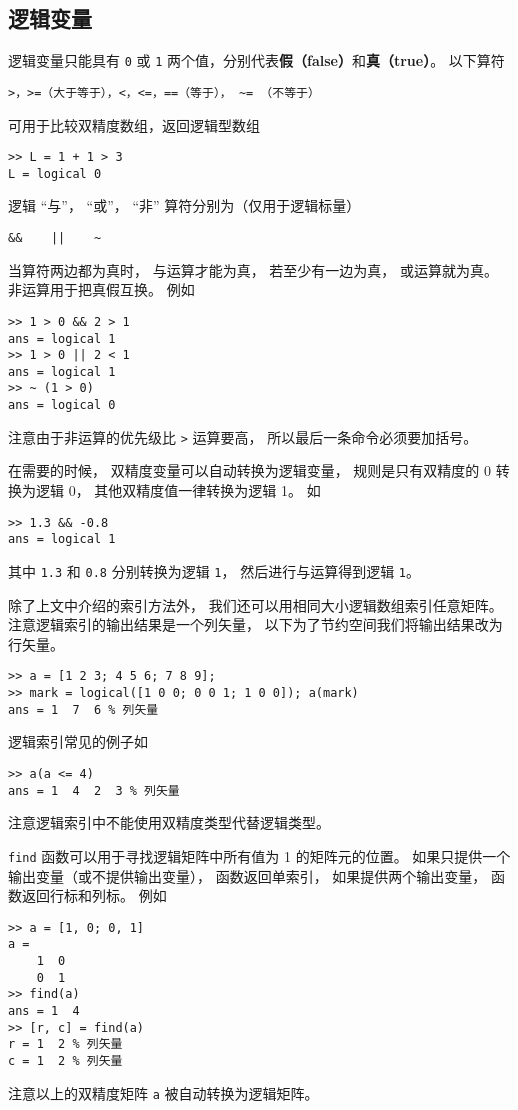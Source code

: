 \subsection{逻辑变量}

逻辑变量只能具有 \verb|0| 或 \verb|1| 两个值，分别代表\textbf{假（false）}和\textbf{真（true）}。 以下算符
\begin{lstlisting}[language=matlabC]
>，>=（大于等于），<，<=，==（等于）， ~= （不等于）
\end{lstlisting}
可用于比较双精度数组，返回逻辑型数组
\begin{lstlisting}[language=matlabC]
>> L = 1 + 1 > 3
L = logical 0
\end{lstlisting}

逻辑 “与”， “或”， “非” 算符分别为（仅用于逻辑标量）
\begin{lstlisting}[language=matlabC]
&&    ||    ~
\end{lstlisting}
当算符两边都为真时， 与运算才能为真， 若至少有一边为真， 或运算就为真。 非运算用于把真假互换。 例如
\begin{lstlisting}[language=matlabC]
>> 1 > 0 && 2 > 1
ans = logical 1
>> 1 > 0 || 2 < 1
ans = logical 1
>> ~ (1 > 0)
ans = logical 0
\end{lstlisting}
注意由于非运算的优先级比 \verb|>| 运算要高， 所以最后一条命令必须要加括号。

在需要的时候， 双精度变量可以自动转换为逻辑变量， 规则是只有双精度的 0 转换为逻辑 0， 其他双精度值一律转换为逻辑 1。 如
\begin{lstlisting}[language=matlabC]
>> 1.3 && -0.8
ans = logical 1
\end{lstlisting}
其中 \verb|1.3| 和 \verb|0.8| 分别转换为逻辑 \verb|1|， 然后进行与运算得到逻辑 \verb|1|。

除了上文中介绍的索引方法外， 我们还可以用相同大小逻辑数组索引任意矩阵。 注意逻辑索引的输出结果是一个列矢量， 以下为了节约空间我们将输出结果改为行矢量。
\begin{lstlisting}[language=matlabC]
>> a = [1 2 3; 4 5 6; 7 8 9];
>> mark = logical([1 0 0; 0 0 1; 1 0 0]); a(mark)
ans = 1  7  6 % 列矢量
\end{lstlisting}
逻辑索引常见的例子如
\begin{lstlisting}[language=matlabC]
>> a(a <= 4)
ans = 1  4  2  3 % 列矢量
\end{lstlisting}
注意逻辑索引中不能使用双精度类型代替逻辑类型。

\verb|find| 函数可以用于寻找逻辑矩阵中所有值为 1 的矩阵元的位置。 如果只提供一个输出变量（或不提供输出变量）， 函数返回单索引， 如果提供两个输出变量， 函数返回行标和列标。 例如
\begin{lstlisting}[language=matlabC]
>> a = [1, 0; 0, 1]
a =
    1  0
    0  1
>> find(a)
ans = 1  4
>> [r, c] = find(a)
r = 1  2 % 列矢量
c = 1  2 % 列矢量
\end{lstlisting}
注意以上的双精度矩阵 \verb|a| 被自动转换为逻辑矩阵。 

